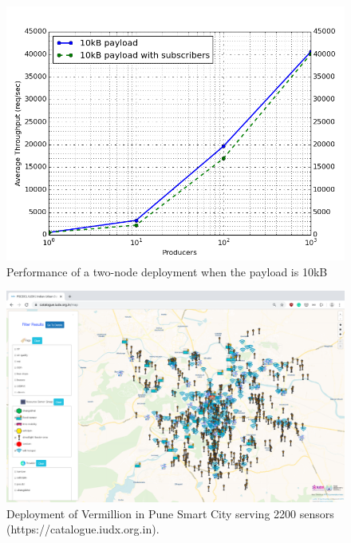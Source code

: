 \documentclass[conference, 10pt]{IEEEtran}
\begin{document}
\begin{figure}
\includegraphics[width=\linewidth, height=\linewidth, keepaspectratio]{10kb-payload.png}
\caption{Performance of a two-node deployment when the payload is 10kB}
\label{10kb}
\end{figure}

\begin{figure}[!h]
\includegraphics[width=\linewidth, height=\linewidth, keepaspectratio]{map.png}
\caption{Deployment of Vermillion in Pune Smart City serving 2200 sensors ({https://catalogue.iudx.org.in}).}
\label{map}
\end{figure}
\end{document}
